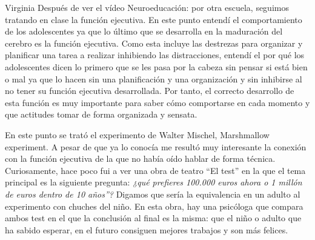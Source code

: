\begin{opin}{\virgicolor}{Virginia}
Después de ver el vídeo Neuroeducación: por otra escuela, seguimos tratando en clase la función ejecutiva. En este punto entendí el comportamiento de los adolescentes ya que lo último que se desarrolla en la maduración del cerebro es la función ejecutiva. Como esta incluye las destrezas para organizar y planificar una tarea a realizar inhibiendo las distracciones, entendí el por qué los adolescentes dicen lo primero que se les pasa por la cabeza sin pensar si está bien o mal ya que lo hacen sin una planificación y una organización y sin inhibirse al no tener su función ejecutiva desarrollada. Por tanto, el correcto desarrollo de esta función es muy importante para saber cómo comportarse en cada momento y que actitudes tomar de forma organizada y sensata.

En este punto se trató el experimento de Walter Mischel, Marshmallow experiment. A pesar de que ya lo conocía me resultó muy interesante la conexión con la función ejecutiva de la que no había oído hablar de forma técnica. Curiosamente, hace poco fui a ver una obra de teatro “El test” en la que el tema principal es la siguiente pregunta: \textit{¿qué prefieres 100.000 euros ahora o 1 millón de euros dentro de 10 años”?} Digamos que sería la equivalencia en un adulto al experimento con chuches del niño. En esta obra, hay una psicóloga que compara ambos test en el que la conclusión al final es la misma: que el niño o adulto que ha sabido esperar, en el futuro consiguen mejores trabajos y son más felices.







\end{opin}
